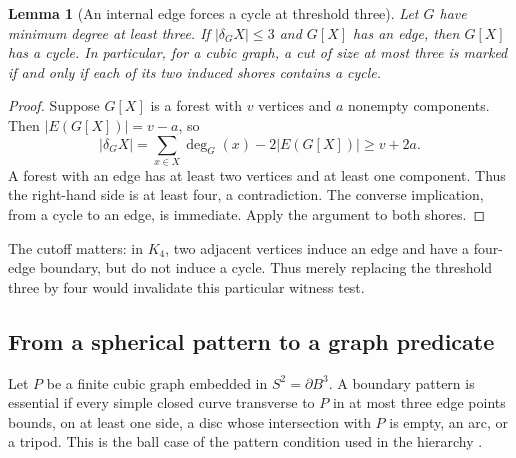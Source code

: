 \documentclass[11pt]{article}
\newtheorem{lemma}[theorem]{Lemma}
\theoremstyle{remark}\newtheorem{remark}[theorem]{Remark}
\newcommand{\cut}{\delta}
\begin{document}
\begin{lemma}[An internal edge forces a cycle at threshold three]
\label{lem:forest}
Let $G$ have minimum degree at least three. If $|\cut_G X|\le3$ and $G[X]$ has an edge, then $G[X]$ has a cycle. In particular, for a cubic graph, a cut of size at most three is marked if and only if each of its two induced shores contains a cycle.
\end{lemma}
\begin{proof}
Suppose $G[X]$ is a forest with $v$ vertices and $a$ nonempty components. Then $|E(G[X])|=v-a$, so
\[
 |\cut_G X|=\sum_{x\in X}\deg_G(x)-2|E(G[X])|
       \ge v+2a.
\]
A forest with an edge has at least two vertices and at least one component. Thus the right-hand side is at least four, a contradiction. The converse implication, from a cycle to an edge, is immediate. Apply the argument to both shores.
\end{proof}

The cutoff matters: in $K_4$, two adjacent vertices induce an edge and have a four-edge boundary, but do not induce a cycle. Thus merely replacing the threshold three by four would invalidate this particular witness test.

\subsection{From a spherical pattern to a graph predicate}
Let $P$ be a finite cubic graph embedded in $S^2=\partial B^3$. A boundary pattern is essential if every simple closed curve transverse to $P$ in at most three edge points bounds, on at least one side, a disc whose intersection with $P$ is empty, an arc, or a tripod. This is the ball case of the pattern condition used in the hierarchy \cite{lackenby2026}.
\end{document}
